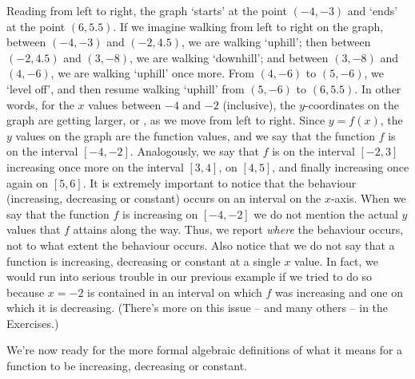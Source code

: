 Reading from left to right, the graph `starts' at the point $(-4,-3)$ and `ends' at the point $(6,5.5)$.  If we imagine walking from left to right on the graph, between $(-4,-3)$ and $(-2,4.5)$, we are walking `uphill'; then between $(-2,4.5)$ and $(3,-8)$, we are walking `downhill'; and between $(3,-8)$ and $(4,-6)$, we are walking `uphill' once more.  From $(4,-6)$ to $(5, -6)$, we `level off', and then resume walking `uphill' from $(5,-6)$ to $(6,5.5)$.  In other words, for the $x$ values between $-4$ and $-2$ (inclusive), the $y$-coordinates on the graph are getting larger, or  , as we move from left to right.  Since $y = f(x)$, the $y$ values on the graph are the function values, and we say that the function $f$ is  on the interval $[-4,-2]$.  Analogously, we say that $f$ is   on the interval $[-2,3]$ increasing once more on the interval $[3,4]$,   on $[4,5]$, and finally increasing once again on $[5,6]$.  It is extremely important to notice that the behaviour (increasing, decreasing or constant) occurs on an interval on the $x$-axis.  When we say that the function $f$ is increasing on $[-4, -2]$ we do not mention the actual $y$ values that $f$ attains along the way.  Thus, we report \emph{where} the behaviour occurs, not to what extent the behaviour occurs. Also notice that we do not say that a function is increasing, decreasing or constant at a single $x$ value.  In fact, we would run into serious trouble in our previous example if we tried to do so because $x = -2$ is contained in an interval on which $f$ was increasing and one on which it is decreasing.  (There's more on this issue -- and many others -- in the Exercises.) 




We're now ready for the more formal algebraic definitions of what it means for a function to be increasing, decreasing or constant.

\smallskip

